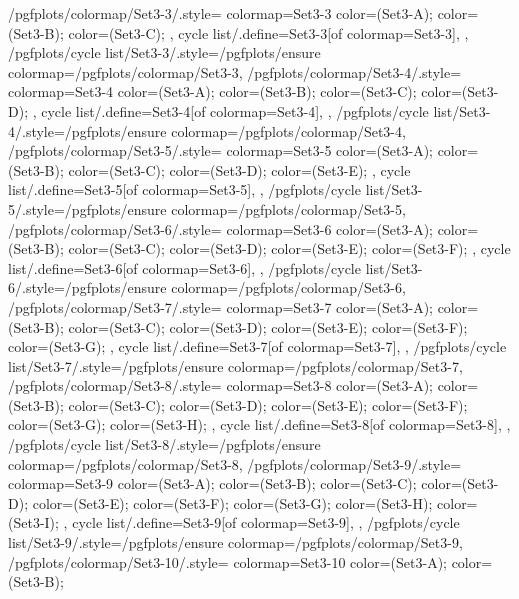 {  /pgfplots/colormap/Set3-3/.style={
    colormap={Set3-3}{
      color=(Set3-A);
      color=(Set3-B);
      color=(Set3-C);
    },
    cycle list/.define={Set3-3}{[of colormap=Set3-3]},
  },
  /pgfplots/cycle list/Set3-3/.style={/pgfplots/ensure colormap={/pgfplots/colormap/Set3-3}},
  /pgfplots/colormap/Set3-4/.style={
    colormap={Set3-4}{
      color=(Set3-A);
      color=(Set3-B);
      color=(Set3-C);
      color=(Set3-D);
    },
    cycle list/.define={Set3-4}{[of colormap=Set3-4]},
  },
  /pgfplots/cycle list/Set3-4/.style={/pgfplots/ensure colormap={/pgfplots/colormap/Set3-4}},
  /pgfplots/colormap/Set3-5/.style={
    colormap={Set3-5}{
      color=(Set3-A);
      color=(Set3-B);
      color=(Set3-C);
      color=(Set3-D);
      color=(Set3-E);
    },
    cycle list/.define={Set3-5}{[of colormap=Set3-5]},
  },
  /pgfplots/cycle list/Set3-5/.style={/pgfplots/ensure colormap={/pgfplots/colormap/Set3-5}},
  /pgfplots/colormap/Set3-6/.style={
    colormap={Set3-6}{
      color=(Set3-A);
      color=(Set3-B);
      color=(Set3-C);
      color=(Set3-D);
      color=(Set3-E);
      color=(Set3-F);
    },
    cycle list/.define={Set3-6}{[of colormap=Set3-6]},
  },
  /pgfplots/cycle list/Set3-6/.style={/pgfplots/ensure colormap={/pgfplots/colormap/Set3-6}},
  /pgfplots/colormap/Set3-7/.style={
    colormap={Set3-7}{
      color=(Set3-A);
      color=(Set3-B);
      color=(Set3-C);
      color=(Set3-D);
      color=(Set3-E);
      color=(Set3-F);
      color=(Set3-G);
    },
    cycle list/.define={Set3-7}{[of colormap=Set3-7]},
  },
  /pgfplots/cycle list/Set3-7/.style={/pgfplots/ensure colormap={/pgfplots/colormap/Set3-7}},
  /pgfplots/colormap/Set3-8/.style={
    colormap={Set3-8}{
      color=(Set3-A);
      color=(Set3-B);
      color=(Set3-C);
      color=(Set3-D);
      color=(Set3-E);
      color=(Set3-F);
      color=(Set3-G);
      color=(Set3-H);
    },
    cycle list/.define={Set3-8}{[of colormap=Set3-8]},
  },
  /pgfplots/cycle list/Set3-8/.style={/pgfplots/ensure colormap={/pgfplots/colormap/Set3-8}},
  /pgfplots/colormap/Set3-9/.style={
    colormap={Set3-9}{
      color=(Set3-A);
      color=(Set3-B);
      color=(Set3-C);
      color=(Set3-D);
      color=(Set3-E);
      color=(Set3-F);
      color=(Set3-G);
      color=(Set3-H);
      color=(Set3-I);
    },
    cycle list/.define={Set3-9}{[of colormap=Set3-9]},
  },
  /pgfplots/cycle list/Set3-9/.style={/pgfplots/ensure colormap={/pgfplots/colormap/Set3-9}},
  /pgfplots/colormap/Set3-10/.style={
    colormap={Set3-10}{
      color=(Set3-A);
      color=(Set3-B);
}}}
